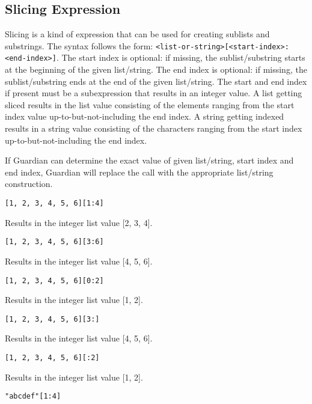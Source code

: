 
\subsection{Slicing Expression}
{
	Slicing is a kind of expression that can be used for creating sublists
	and substrings. The syntax follows the
	form: \texttt{<list-or-string>[<start-index>:<end-index>]}.
	The start index is optional: if missing, the sublist/substring starts at
	the beginning of the given list/string.
	The end index is optional: if missing, the sublist/substring ends at
	the end of the given list/string.
	The start and end index if present must be a subexpression that results
	in an integer value.
	A list getting sliced results in the list value consisting of the elements
	ranging from the start index value up-to-but-not-including the end index.
	A string getting indexed results in a string value consisting of the
	characters ranging from the start index up-to-but-not-including the end
	index.
	
	If Guardian can determine the exact value of given list/string,
	start index and end index, Guardian
	will replace the call with the appropriate list/string construction.
	
	\begin{itemize}
	{
		\item[] \lstinline[language=MAIA, columns=fixed]@[1, 2, 3, 4, 5, 6][1:4]@
		
			Results in the integer list value [2, 3, 4].
		
		\item[] \lstinline[language=MAIA, columns=fixed]@[1, 2, 3, 4, 5, 6][3:6]@
		
			Results in the integer list value [4, 5, 6].
		
		\item[] \lstinline[language=MAIA, columns=fixed]@[1, 2, 3, 4, 5, 6][0:2]@
		
			Results in the integer list value [1, 2].
		
		\item[] \lstinline[language=MAIA, columns=fixed]@[1, 2, 3, 4, 5, 6][3:]@
		
			Results in the integer list value [4, 5, 6].
		
		\item[] \lstinline[language=MAIA, columns=fixed]@[1, 2, 3, 4, 5, 6][:2]@
		
			Results in the integer list value [1, 2].
		
		\item[] \lstinline[language=MAIA, columns=fixed]@"abcdef"[1:4]@
		
}
\end{itemize}}
